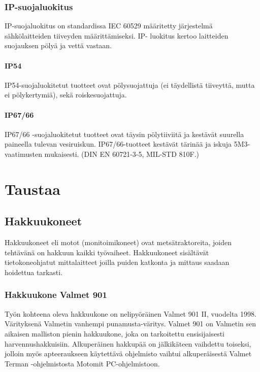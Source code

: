 \documentclass[11pt,a4paper,oneside,article]{memoir}
\begin{document}
\subsection{IP-suojaluokitus}

IP-suojaluokitus on standardissa IEC 60529 määritetty järjestelmä sähkölaitteiden tiiveyden määrittämiseksi. IP- luokitus kertoo laitteiden suojauksen pölyä ja vettä vastaan. \cite{IEC60529}

\subsubsection{IP54}

IP54-suojaluokitetut tuotteet ovat pölysuojattuja (ei täydellistä tiiveyttä, mutta ei pölykertymiä), sekä roiskesuojattuja.

\subsubsection{IP67/66}

IP67/66 -suojaluokitetut tuotteet ovat täysin pölytiiviitä ja kestävät suurella paineella tulevan vesiruiskun. IP67/66-tuotteet kestävät tärinää ja iskuja 5M3-vaatimusten mukaisesti. (DIN EN 60721-3-5, MIL-STD 810F.)

\chapter{Taustaa}
\section{Hakkuukoneet}

Hakkuukoneet eli motot (monitoimikoneet) ovat metsätraktoreita, joiden tehtävänä on hakkuun kaikki työvaiheet. Hakkuukoneet sisältävät tietokoneohjatut mittalaitteet joilla puiden katkonta ja mittaus saadaan hoidettua tarkasti.

\subsection{Hakkuukone Valmet 901}

Työn kohteena oleva hakkuukone on nelipyöräinen Valmet 901 II, vuodelta 1998. Värityksenä Valmetin vanhempi punamusta-väritys. Valmet 901 on Valmetin sen aikaisen malliston pienin hakkuukone, joka on tarkoitettu ensisijaisesti harvennushakkuisiin. Alkuperäinen hakkupää on jälkikäteen vaihdettu toiseksi, jolloin myös apteeraukseen käytettävä ohjelmisto vaihtui alkuperäisestä Valmet Terman -ohjelmistosta Motomit PC-ohjelmistoon.
\end{document}
